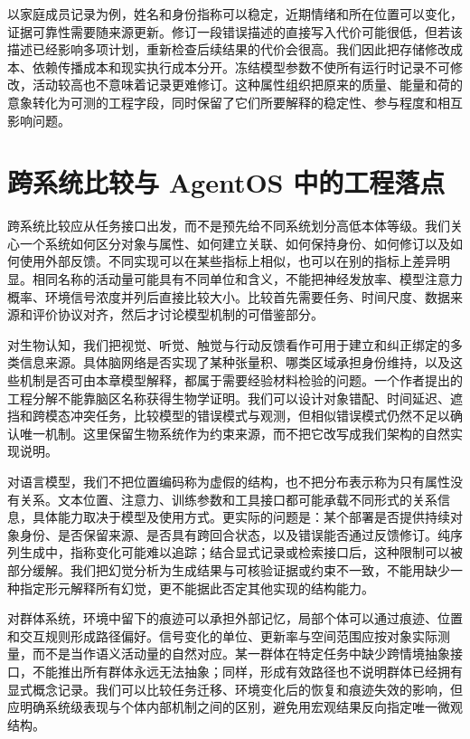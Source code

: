 以家庭成员记录为例，姓名和身份指称可以稳定，近期情绪和所在位置可以变化，证据可靠性需要随来源更新。修订一段错误描述的直接写入代价可能很低，但若该描述已经影响多项计划，重新检查后续结果的代价会很高。我们因此把存储修改成本、依赖传播成本和现实执行成本分开。冻结模型参数不使所有运行时记录不可修改，活动较高也不意味着记录更难修订。这种属性组织把原来的质量、能量和荷的意象转化为可测的工程字段，同时保留了它们所要解释的稳定性、参与程度和相互影响问题。

\section{跨系统比较与 AgentOS 中的工程落点}
\label{sec:section_2084}

跨系统比较应从任务接口出发，而不是预先给不同系统划分高低本体等级。我们关心一个系统如何区分对象与属性、如何建立关联、如何保持身份、如何修订以及如何使用外部反馈。不同实现可以在某些指标上相似，也可以在别的指标上差异明显。相同名称的活动量可能具有不同单位和含义，不能把神经发放率、模型注意力概率、环境信号浓度并列后直接比较大小。比较首先需要任务、时间尺度、数据来源和评价协议对齐，然后才讨论模型机制的可借鉴部分。

对生物认知，我们把视觉、听觉、触觉与行动反馈看作可用于建立和纠正绑定的多类信息来源。具体脑网络是否实现了某种张量积、哪类区域承担身份维持，以及这些机制是否可由本章模型解释，都属于需要经验材料检验的问题。一个作者提出的工程分解不能靠脑区名称获得生物学证明。我们可以设计对象错配、时间延迟、遮挡和跨模态冲突任务，比较模型的错误模式与观测，但相似错误模式仍然不足以确认唯一机制。这里保留生物系统作为约束来源，而不把它改写成我们架构的自然实现说明。

对语言模型，我们不把位置编码称为虚假的结构，也不把分布表示称为只有属性没有关系。文本位置、注意力、训练参数和工具接口都可能承载不同形式的关系信息，具体能力取决于模型及使用方式。更实际的问题是：某个部署是否提供持续对象身份、是否保留来源、是否具有跨回合状态，以及错误能否通过反馈修订。纯序列生成中，指称变化可能难以追踪；结合显式记录或检索接口后，这种限制可以被部分缓解。我们把幻觉分析为生成结果与可核验证据或约束不一致，不能用缺少一种指定形元解释所有幻觉，更不能据此否定其他实现的结构能力。

对群体系统，环境中留下的痕迹可以承担外部记忆，局部个体可以通过痕迹、位置和交互规则形成路径偏好。信号变化的单位、更新率与空间范围应按对象实际测量，而不是当作语义活动量的自然对应。某一群体在特定任务中缺少跨情境抽象接口，不能推出所有群体永远无法抽象；同样，形成有效路径也不说明群体已经拥有显式概念记录。我们可以比较任务迁移、环境变化后的恢复和痕迹失效的影响，但应明确系统级表现与个体内部机制之间的区别，避免用宏观结果反向指定唯一微观结构。

